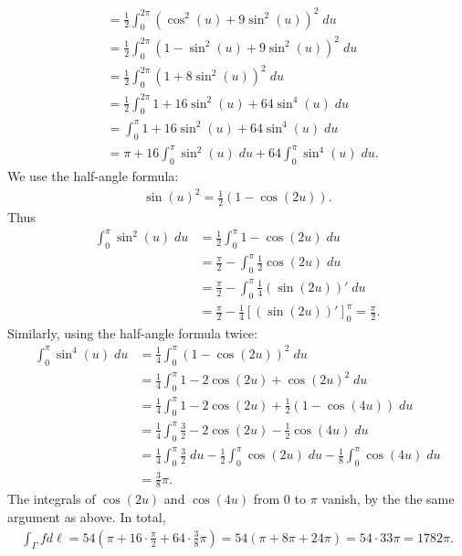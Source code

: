 \documentclass[11pt]{article}
\begin{document}
\begin{solution}
\begin{align*}
        \\&=
        \frac {1} 2 \int_0^{2\pi} \left( \cos^2(u) + 9 \sin^2(u) \right)^{2} \;du
        \\&=
        \frac {1} 2 \int_0^{2\pi} \left( 1 - \sin^2(u) + 9 \sin^2(u) \right)^{2} \;du
        \\&=
        \frac {1} 2 \int_0^{2\pi} \left( 1 + 8 \sin^2(u) \right)^{2} \;du
        \\&=
        \frac {1} 2 \int_0^{2\pi} 1 + 16 \sin^2(u) + 64 \sin^4(u) \;du
        \\&=
        \int_0^{\pi} 1 + 16 \sin^2(u) + 64 \sin^4(u) \;du
        \\&=
        \pi + 16 \int_0^{\pi} \sin^2(u) \;du + 64 \int_0^{\pi} \sin^4(u) \;du
        .
    \end{align*}
    We use the half-angle formula:
    \begin{align*}
        \sin(u)^2 = \frac 1 2 \left( 1 - \cos(2u) \right).
    \end{align*}
    Thus
    \begin{align*}
        \int_0^{\pi} \sin^2(u) \;du
        &=
        \frac 1 2 \int_0^{\pi} 1 - \cos(2u) \;du
        \\&=
        \frac \pi 2 - \int_0^{\pi} \frac 1 2 \cos(2u) \;du
        \\&=
        \frac \pi 2 - \int_0^{\pi} \frac 1 4 (\sin(2u))' \;du
        \\&=
        \frac \pi 2 - \frac 1 4 \left[ (\sin(2u))' \right]_0^\pi
        =
        \frac \pi 2
        .
    \end{align*}
    Similarly, using the half-angle formula twice: 
    \begin{align*}
        \int_0^{\pi} \sin^4(u) \;du
        &=
        \frac 1 4 \int_0^{\pi} \left( 1 - \cos(2u) \right)^2 \;du
        \\&=
        \frac 1 4 \int_0^{\pi} 1 - 2 \cos(2u) + \cos(2u)^2 \;du
        \\&=
        \frac 1 4 \int_0^{\pi} 1 - 2 \cos(2u) + \frac 1 2 \left( 1 - \cos(4u) \right) \;du
        \\&=
        \frac 1 4 \int_0^{\pi} \frac 3 2 - 2 \cos(2u) - \frac 1 2 \cos(4u) \;du
        \\&=
        \frac 1 4 \int_0^{\pi} \frac 3 2 \;du - \frac 1 2 \int_0^{\pi} \cos(2u) \;du - \frac 1 8 \int_0^{\pi} \cos(4u) \;du
        \\&=
        \frac 3 8 \pi
        .
    \end{align*}
    The integrals of $\cos(2u)$ and $\cos(4u)$ from $0$ to $\pi$ vanish, by the the same argument as above. 
    In total,
    \begin{align*}
        \int_\Gamma f d\ell
        =
        54
        \left(
            \pi + 16 \cdot \frac \pi 2 + 64 \cdot \frac 3 8 \pi
        \right)
        =
        54
        \left(
        \pi + 8\pi + 24 \pi
        \right)
        =
        54 \cdot 33 \pi
        =
        1782 \pi
        .
    \end{align*}
\end{solution}
\end{document}
